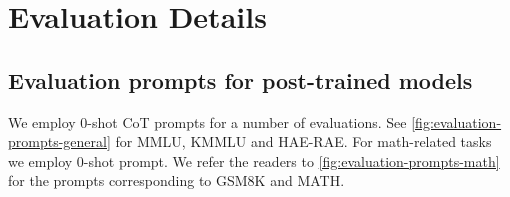 \section{Evaluation Details}

\subsection{Evaluation prompts for post-trained models} \label{subsec:evaluation-prompts-for-post-trained-models}

We employ 0-shot CoT prompts for a number of evaluations. 
See \autoref{fig:evaluation-prompts-general} for MMLU, KMMLU and HAE-RAE.
For math-related tasks we employ 0-shot prompt.
We refer the readers to \autoref{fig:evaluation-prompts-math} for the prompts corresponding to GSM8K and MATH.

